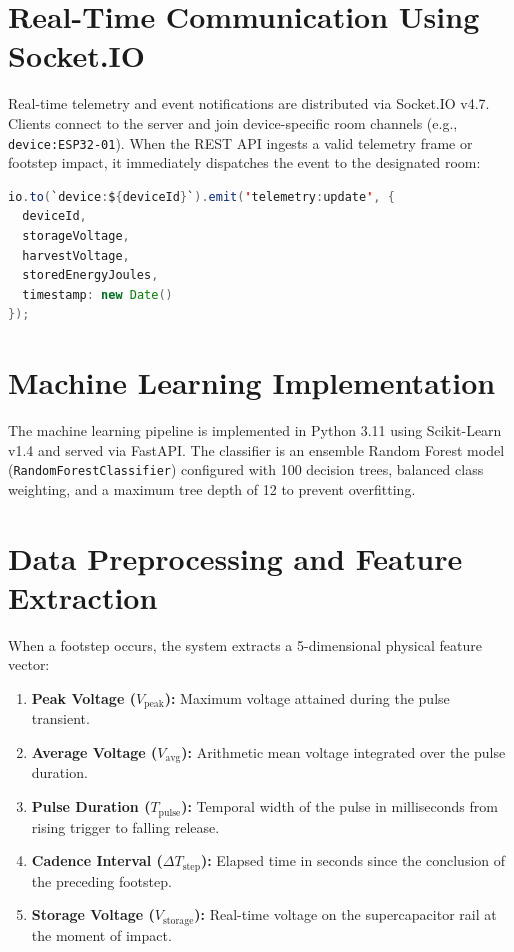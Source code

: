 \section{Real-Time Communication Using Socket.IO}
Real-time telemetry and event notifications are distributed via Socket.IO v4.7. Clients connect to the server and join device-specific room channels (e.g., \texttt{device:ESP32-01}). When the REST API ingests a valid telemetry frame or footstep impact, it immediately dispatches the event to the designated room:
\begin{lstlisting}[language=Java, caption={Socket.IO device-scoped event emission.}, label={lst:socket_emit}]
io.to(`device:${deviceId}`).emit('telemetry:update', {
  deviceId,
  storageVoltage,
  harvestVoltage,
  storedEnergyJoules,
  timestamp: new Date()
});
\end{lstlisting}

\section{Machine Learning Implementation}
The machine learning pipeline is implemented in Python 3.11 using Scikit-Learn v1.4 and served via FastAPI. The classifier is an ensemble Random Forest model (\texttt{RandomForest}\-\texttt{Classifier}) configured with 100 decision trees, balanced class weighting, and a maximum tree depth of 12 to prevent overfitting.

\section{Data Preprocessing and Feature Extraction}
When a footstep occurs, the system extracts a 5-dimensional physical feature vector:
\begin{enumerate}
    \item \textbf{Peak Voltage ($V_{\text{peak}}$):} Maximum voltage attained during the pulse transient.
    \item \textbf{Average Voltage ($V_{\text{avg}}$):} Arithmetic mean voltage integrated over the pulse duration.
    \item \textbf{Pulse Duration ($T_{\text{pulse}}$):} Temporal width of the pulse in milliseconds from rising trigger to falling release.
    \item \textbf{Cadence Interval ($\Delta T_{\text{step}}$):} Elapsed time in seconds since the conclusion of the preceding footstep.
    \item \textbf{Storage Voltage ($V_{\text{storage}}$):} Real-time voltage on the supercapacitor rail at the moment of impact.
\end{enumerate}

